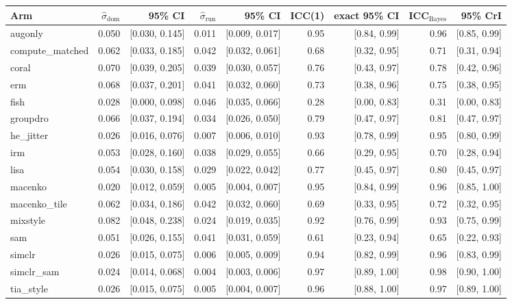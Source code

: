 \begin{tabular}{lrrrrrrrr}
\toprule
Arm & $\hat\sigma_\text{dom}$ & 95\% CI & $\hat\sigma_\text{run}$ & 95\% CI & ICC(1) & exact 95\% CI & ICC$_\text{Bayes}$ & 95\% CrI \\
\midrule
augonly & 0.050 & [0.030, 0.145] & 0.011 & [0.009, 0.017] & 0.95 & [0.84, 0.99] & 0.96 & [0.85, 0.99] \\
compute\_matched & 0.062 & [0.033, 0.185] & 0.042 & [0.032, 0.061] & 0.68 & [0.32, 0.95] & 0.71 & [0.31, 0.94] \\
coral & 0.070 & [0.039, 0.205] & 0.039 & [0.030, 0.057] & 0.76 & [0.43, 0.97] & 0.78 & [0.42, 0.96] \\
erm & 0.068 & [0.037, 0.201] & 0.041 & [0.032, 0.060] & 0.73 & [0.38, 0.96] & 0.75 & [0.38, 0.95] \\
fish & 0.028 & [0.000, 0.098] & 0.046 & [0.035, 0.066] & 0.28 & [0.00, 0.83] & 0.31 & [0.00, 0.83] \\
groupdro & 0.066 & [0.037, 0.194] & 0.034 & [0.026, 0.050] & 0.79 & [0.47, 0.97] & 0.81 & [0.47, 0.97] \\
he\_jitter & 0.026 & [0.016, 0.076] & 0.007 & [0.006, 0.010] & 0.93 & [0.78, 0.99] & 0.95 & [0.80, 0.99] \\
irm & 0.053 & [0.028, 0.160] & 0.038 & [0.029, 0.055] & 0.66 & [0.29, 0.95] & 0.70 & [0.28, 0.94] \\
lisa & 0.054 & [0.030, 0.158] & 0.029 & [0.022, 0.042] & 0.77 & [0.45, 0.97] & 0.80 & [0.45, 0.97] \\
macenko & 0.020 & [0.012, 0.059] & 0.005 & [0.004, 0.007] & 0.95 & [0.84, 0.99] & 0.96 & [0.85, 1.00] \\
macenko\_tile & 0.062 & [0.034, 0.186] & 0.042 & [0.032, 0.060] & 0.69 & [0.33, 0.95] & 0.72 & [0.32, 0.95] \\
mixstyle & 0.082 & [0.048, 0.238] & 0.024 & [0.019, 0.035] & 0.92 & [0.76, 0.99] & 0.93 & [0.75, 0.99] \\
sam & 0.051 & [0.026, 0.155] & 0.041 & [0.031, 0.059] & 0.61 & [0.23, 0.94] & 0.65 & [0.22, 0.93] \\
simclr & 0.026 & [0.015, 0.075] & 0.006 & [0.005, 0.009] & 0.94 & [0.82, 0.99] & 0.96 & [0.83, 0.99] \\
simclr\_sam & 0.024 & [0.014, 0.068] & 0.004 & [0.003, 0.006] & 0.97 & [0.89, 1.00] & 0.98 & [0.90, 1.00] \\
tia\_style & 0.026 & [0.015, 0.075] & 0.005 & [0.004, 0.007] & 0.96 & [0.88, 1.00] & 0.97 & [0.89, 1.00] \\
\bottomrule
\end{tabular}
